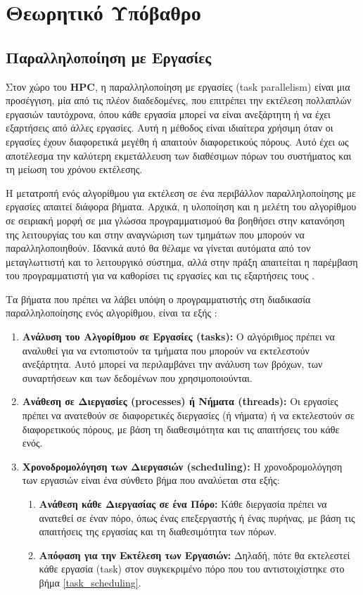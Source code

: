 
\chapter{Θεωρητικό Υπόβαθρο}

\section{Παραλληλοποίηση με Εργασίες}

Στον χώρο του \textbf{HPC}, η παραλληλοποίηση με εργασίες (task parallelism) είναι μια προσέγγιση, μία από τις πλέον διαδεδομένες, που επιτρέπει την εκτέλεση πολλαπλών εργασιών ταυτόχρονα, όπου κάθε εργασία μπορεί να είναι ανεξάρτητη ή να έχει εξαρτήσεις από άλλες εργασίες. Αυτή η μέθοδος είναι ιδιαίτερα χρήσιμη όταν οι εργασίες έχουν διαφορετικά μεγέθη ή απαιτούν διαφορετικούς πόρους. Αυτό έχει ως αποτέλεσμα την καλύτερη εκμετάλλευση των διαθέσιμων πόρων του συστήματος και τη μείωση του χρόνου εκτέλεσης.

Η μετατροπή ενός αλγορίθμου για εκτέλεση σε ένα περιβάλλον παραλληλοποίησης με εργασίες απαιτεί διάφορα βήματα. Αρχικά, η υλοποίηση και η μελέτη του αλγορίθμου σε σειριακή μορφή σε μια γλώσσα προγραμματισμού θα βοηθήσει στην κατανόηση της λειτουργίας του και στην αναγνώριση των τμημάτων που μπορούν να παραλληλοποιηθούν. Ιδανικά αυτό θα θέλαμε να γίνεται αυτόματα από τον μεταγλωττιστή και το λειτουργικό σύστημα, αλλά στην πράξη απαιτείται η παρέμβαση του προγραμματιστή για να καθορίσει τις εργασίες και τις εξαρτήσεις τους \cite{papadakis2012}.

Τα βήματα που πρέπει να λάβει υπόψη ο προγραμματιστής στη διαδικασία παραλληλοποίησης ενός αλγορίθμου, είναι τα εξής \cite{papadakis2012}:
\begin{enumerate}
    \item \textbf{Ανάλυση του Αλγορίθμου σε Εργασίες (tasks):} Ο αλγόριθμος πρέπει να αναλυθεί για να εντοπιστούν τα τμήματα που μπορούν να εκτελεστούν ανεξάρτητα. Αυτό μπορεί να περιλαμβάνει την ανάλυση των βρόχων, των συναρτήσεων και των δεδομένων που χρησιμοποιούνται.
    \item \textbf{Ανάθεση σε Διεργασίες (processes) ή Νήματα (threads):} Οι εργασίες πρέπει να ανατεθούν σε διαφορετικές διεργασίες (ή νήματα) ή να εκτελεστούν σε διαφορετικούς πόρους, με βάση τη διαθεσιμότητα και τις απαιτήσεις του κάθε ενός.
    \item \textbf{Χρονοδρομολόγηση των Διεργασιών (scheduling):} Η χρονοδρομολόγηση των εργασιών είναι ένα σύνθετο βήμα που αναλύεται στα εξής:
    \begin{enumerate}
        \item \label{task_scheduling} \textbf{Ανάθεση κάθε Διεργασίας σε ένα Πόρο:} Κάθε διεργασία πρέπει να ανατεθεί σε έναν πόρο, όπως ένας επεξεργαστής ή ένας πυρήνας, με βάση τις απαιτήσεις της εργασίας και τη διαθεσιμότητα των πόρων.
        \item \textbf{Απόφαση για την Εκτέλεση των Εργασιών:} Δηλαδή, πότε θα εκτελεστεί κάθε εργασία (task) στον συγκεκριμένο πόρο που του αντιστοιχίστηκε στο βήμα \ref{task_scheduling}.
    \end{enumerate}
\end{enumerate}

